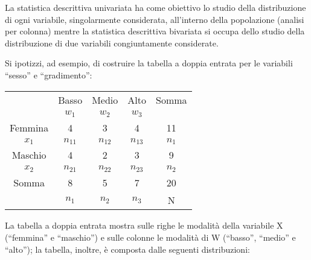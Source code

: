 \vspace{12pt}
La statistica descrittiva univariata ha come obiettivo lo studio della 
distribuzione di ogni variabile, singolarmente considerata, all'interno 
della popolazione (analisi per colonna) mentre la statistica descrittiva 
bivariata si occupa dello studio della distribuzione di due variabili 
congiuntamente considerate.

Si ipotizzi, ad esempio, di costruire la tabella a doppia entrata per le 
variabili ``sesso'' e ``gradimento'':

\begin{center}
\begin{tabular}{|c|c|c|c|c|}
\hline
 & Basso & Medio & Alto & Somma\\
 & \(w_1\) & \(w_2\) &  \(w_3\) & \\
 \hline
 Femmina & 4 & 3 & 4 & 11\\
 \(x_1\) & \(n_{11}\) & \(n_{12}\) &  \(n_{13}\) & \(n_1\) \\
  \hline
   Maschio & 4 & 2 & 3 & 9\\
   \(x_2\) & \(n_{21}\) & \(n_{22}\) &  \(n_{23}\) & \(n_2\) \\
   \hline
 Somma  & 8 & 5& 7&20\\
    & \(n_{1}\) & \(n_{2}\) &  \(n_{3}\) & N \\  
  \hline
\end{tabular}
\end{center}

\vspace{6pt}
La tabella a doppia entrata mostra sulle righe le modalità della 
variabile X (``femmina'' e ``maschio'') e sulle colonne le modalità di 
W (``basso'', ``medio'' e ``alto''); la tabella, inoltre, è composta dalle 
seguenti distribuzioni:  

